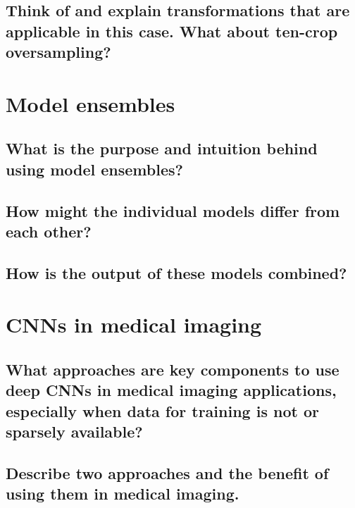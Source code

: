 \subsection{Think of and explain transformations that are applicable in this case. What about ten-crop oversampling?}

\section{Model ensembles}
\subsection{What is the purpose and intuition behind using model ensembles?}
\subsection{How might the individual models differ from each other?}
\subsection{How is the output of these models combined?}

\section{CNNs in medical imaging}
\subsection{What approaches are key components to use deep CNNs in medical imaging applications, especially when data for training is not or sparsely available?}
\subsection{Describe two approaches and the benefit of using them in medical imaging.}

\addtocounter{section}{-1}\section{}\label{sec:todo}
